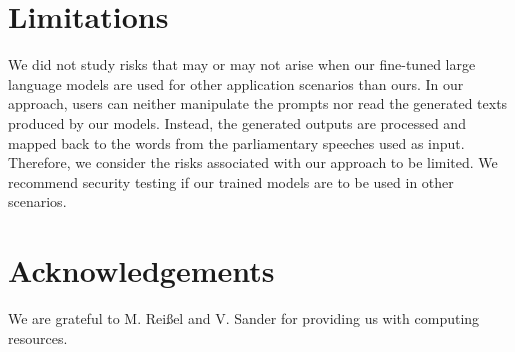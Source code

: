 \documentclass[11pt,a4paper]{article}
\begin{document}
\section*{Limitations}

We did not study risks that may or may not arise when our fine-tuned large language models are used for other application scenarios than ours. In our approach, users can neither manipulate the prompts nor read the generated texts produced by our models. Instead, the generated outputs are processed and mapped back to the words from the parliamentary speeches used as input. Therefore, we consider the risks associated with our approach to be limited. We recommend security testing if our trained models are to be used in other scenarios.

\section*{Acknowledgements}
We are grateful to M. Reißel and V. Sander for providing us with computing resources.
\end{document}
